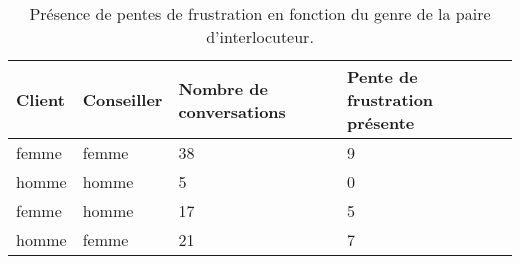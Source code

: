 \begin{table}[]
\centering
\begin{tabular}{|l l|l|l|}
 \hline
 Client	&Conseiller	&Nombre de conversations	&Pente de frustration présente \\
 \hline
femme	&femme	&38	&9	\\
homme	&homme	&5	&0	\\
femme	&homme	&17	&5	\\
homme	&femme	&21	&7	\\
 \hline
\end{tabular}
\caption{Présence de pentes de frustration en fonction du genre de la paire d'interlocuteur.}
\label{tab:genre}
\end{table}
